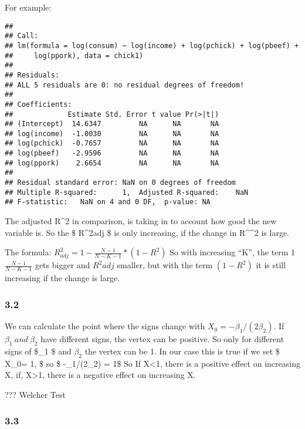 \documentclass[
]{article}
\begin{document}
For example:

\begin{verbatim}
## 
## Call:
## lm(formula = log(consum) ~ log(income) + log(pchick) + log(pbeef) + 
##     log(ppork), data = chick1)
## 
## Residuals:
## ALL 5 residuals are 0: no residual degrees of freedom!
## 
## Coefficients:
##             Estimate Std. Error t value Pr(>|t|)
## (Intercept)  14.6347         NA      NA       NA
## log(income)  -1.0030         NA      NA       NA
## log(pchick)  -0.7657         NA      NA       NA
## log(pbeef)   -2.9596         NA      NA       NA
## log(ppork)    2.6654         NA      NA       NA
## 
## Residual standard error: NaN on 0 degrees of freedom
## Multiple R-squared:      1,  Adjusted R-squared:    NaN 
## F-statistic:   NaN on 4 and 0 DF,  p-value: NA
\end{verbatim}

The adjusted R\^{}2 in comparison, is taking in to account how good the
new variable is. So the \$ R\^{}2adj \$ is only increasing, if the
change in R\^{}\^{}2 is large.

The formula: \(R^2_{adj} = 1 - \frac{N-1}{N-K-1} * (1-R^2)\) So with
increasing ``K'', the term 1 \(\frac{N-1}{N-K-1}\) gets bigger and
\(R^2adj\) smaller, but with the term \((1-R^2)\) it is still increasing
if the change is large.

\hypertarget{section-13}{%
\subsubsection{3.2}\label{section-13}}

We can calculate the point where the signs change with
\(X_0 = -\beta_1/(2\beta_2)\). If \(\beta_1 \ and\ \beta_2\) have
different signs, the vertex can be positive. So only for different signs
of \$\beta\_1 \$ and \(\beta_2\) the vertex can be 1. In our case this
is true if we set \$ X\_0= 1, \$ so \$ -\beta\_1/(2\beta\_2) = 1\$ So If
X\textless1, there is a positive effect on increasing X, if,
X\textgreater1, there is a negative effect on increasing X.

??? Welcher Test

\hypertarget{section-14}{%
\subsubsection{3.3}\label{section-14}}
\end{document}
